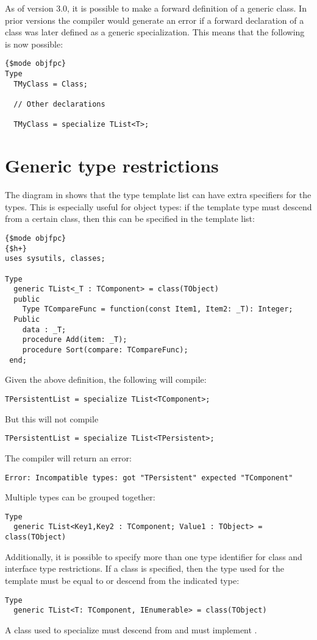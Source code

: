 \begin{remark}
As of version 3.0, it is possible to make a forward definition of a generic class. 
In prior versions the compiler would generate an error if a forward declaration of a class was
later defined as a generic specialization. This means that the following is now possible:
\begin{verbatim}
{$mode objfpc}
Type
  TMyClass = Class;
 
  // Other declarations

  TMyClass = specialize TList<T>;
\end{verbatim}
\end{remark}


\section{Generic type restrictions}
The diagram in  shows that the type template list can have extra specifiers for the types.
This is especially useful for object types: if the template type must descend from a certain class, then this can be 
specified in the template list:
\begin{verbatim}
{$mode objfpc}
{$h+}
uses sysutils, classes;

Type
  generic TList<_T : TComponent> = class(TObject)
  public 
    Type TCompareFunc = function(const Item1, Item2: _T): Integer;
  Public  
    data : _T;
    procedure Add(item: _T);
    procedure Sort(compare: TCompareFunc);
 end;
\end{verbatim}
Given the above definition, the following will compile:
\begin{verbatim}
TPersistentList = specialize TList<TComponent>;
\end{verbatim}
But this will not compile
\begin{verbatim}
TPersistentList = specialize TList<TPersistent>;
\end{verbatim}
The compiler will return an error:
\begin{verbatim}
Error: Incompatible types: got "TPersistent" expected "TComponent"
\end{verbatim}
Multiple types can be grouped together:
\begin{verbatim}
Type
  generic TList<Key1,Key2 : TComponent; Value1 : TObject> = class(TObject)
\end{verbatim}

Additionally, it is possible to specify more than one type identifier for class and interface type restrictions. 
If a class is specified, then the type used for the template must be equal to or descend from the indicated type:
\begin{verbatim}
Type
  generic TList<T: TComponent, IEnumerable> = class(TObject)
\end{verbatim}
A class used to specialize  must descend from  and must implement .

